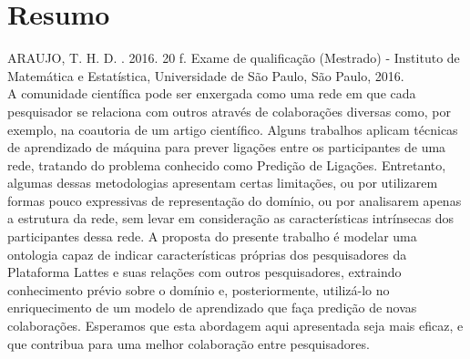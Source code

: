 \documentclass[11pt,twoside,a4paper]{book}
\begin{document}
%
%
%
%


\chapter*{Resumo}

\noindent ARAUJO, T. H. D. \textbf{\mydocumenttitle{}}.
2016. 20 f. Exame de qualificação (Mestrado) - Instituto de Matemática e Estatística,
Universidade de São Paulo, São Paulo, 2016.
\\

A comunidade científica pode ser enxergada como uma rede em que cada pesquisador se relaciona com outros através de colaborações diversas como, por exemplo, na coautoria de um artigo científico. Alguns trabalhos aplicam técnicas de aprendizado de máquina para prever ligações entre os participantes de uma rede, tratando do problema conhecido como Predição de Ligações. Entretanto, algumas dessas metodologias apresentam certas limitações, ou por utilizarem formas pouco expressivas de representação do domínio, ou por analisarem apenas a estrutura da rede, sem levar em consideração as características intrínsecas dos participantes dessa rede. A proposta do presente trabalho é modelar uma ontologia capaz de indicar características próprias dos pesquisadores da Plataforma Lattes e suas relações com outros pesquisadores, extraindo conhecimento prévio sobre o domínio e, posteriormente, utilizá-lo no enriquecimento de um modelo de aprendizado que faça predição de novas colaborações. Esperamos que esta abordagem aqui apresentada seja mais eficaz, e que contribua para uma melhor colaboração entre pesquisadores.
\\
\end{document}
